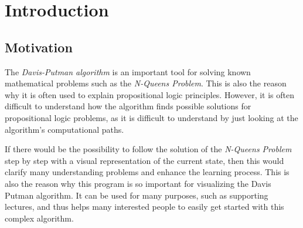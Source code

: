 
\chapter{Introduction}
\label{ch:introduction}

\section{Motivation}
\label{sec:introMotivation}
The \textit{Davis-Putman algorithm} is an important tool for solving known mathematical problems such as the \textit{N-Queens Problem}. This is also the reason why it is often used to explain propositional logic principles. However, it is often difficult to understand how the algorithm finds possible solutions for propositional logic problems, as it is difficult to understand by just looking at the algorithm's computational paths.

If there would be the possibility to follow the solution of the \textit{N-Queens Problem} step by step with a visual representation of the current state, then this would clarify many understanding problems and enhance the learning process. This is also the reason why this program is so important for visualizing the Davis Putman algorithm. It can be used for many purposes, such as supporting lectures, and thus helps many interested people to easily get started with this complex algorithm.

